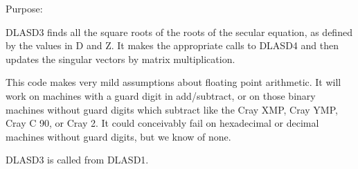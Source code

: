  \begin{DoxyParagraph}{Purpose\+: }
\begin{DoxyVerb} DLASD3 finds all the square roots of the roots of the secular
 equation, as defined by the values in D and Z.  It makes the
 appropriate calls to DLASD4 and then updates the singular
 vectors by matrix multiplication.

 This code makes very mild assumptions about floating point
 arithmetic. It will work on machines with a guard digit in
 add/subtract, or on those binary machines without guard digits
 which subtract like the Cray XMP, Cray YMP, Cray C 90, or Cray 2.
 It could conceivably fail on hexadecimal or decimal machines
 without guard digits, but we know of none.

 DLASD3 is called from DLASD1.\end{DoxyVerb}
 
\end{DoxyParagraph}


